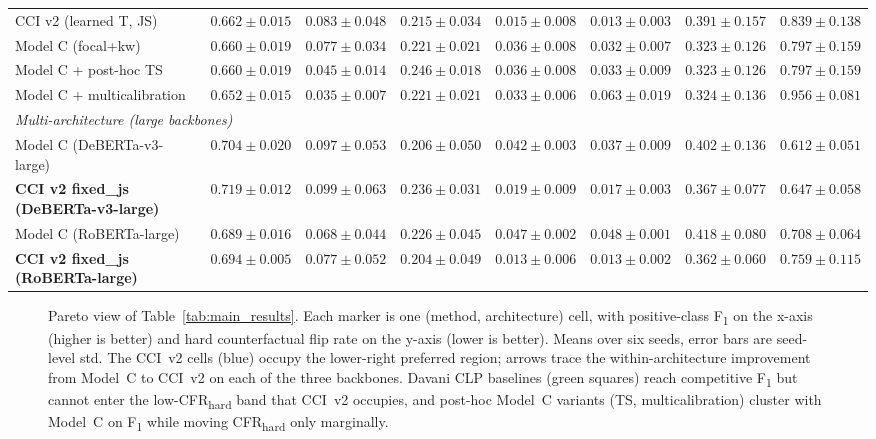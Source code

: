 \documentclass[10pt,a4paper]{article}
\begin{document}
\begin{table}[t]
\begin{tabular}{@{}lccccccc@{}}
CCI v2 (learned T, JS) & $0.662 \pm 0.015$ & $\mathbf{0.083 \pm 0.048}$ & $0.215 \pm 0.034$ & $\mathbf{0.015 \pm 0.008}$ & $\mathbf{0.013 \pm 0.003}$ & $0.391 \pm 0.157$ & $0.839 \pm 0.138$ \\
Model C (focal+kw)              & $0.660 \pm 0.019$ & $0.077 \pm 0.034$ & $0.221 \pm 0.021$ & $0.036 \pm 0.008$\textbf{\*} & $0.032 \pm 0.007$\textbf{\*} & $\mathbf{0.323 \pm 0.126}$ & $0.797 \pm 0.159$ \\
Model C + post-hoc TS           & $0.660 \pm 0.019$ & $0.045 \pm 0.014$ & $0.246 \pm 0.018$ & $0.036 \pm 0.008$\textbf{\*} & $0.033 \pm 0.009$\textbf{\*} & $\mathbf{0.323 \pm 0.126}$ & $0.797 \pm 0.159$ \\
Model C + multicalibration      & $0.652 \pm 0.015$ & $\mathbf{0.035 \pm 0.007}$ & $0.221 \pm 0.021$ & $0.033 \pm 0.006$\textbf{\*} & $0.063 \pm 0.019$\textbf{\*} & $0.324 \pm 0.136$ & $0.956 \pm 0.081$ \\
\midrule
\multicolumn{8}{l}{\emph{Multi-architecture (large backbones)}} \\
Model C (DeBERTa-v3-large)      & $0.704 \pm 0.020$ & $0.097 \pm 0.053$ & $0.206 \pm 0.050$ & $0.042 \pm 0.003$ & $0.037 \pm 0.009$ & $0.402 \pm 0.136$ & $\mathbf{0.612 \pm 0.051}$ \\
\textbf{CCI v2 fixed\_js (DeBERTa-v3-large)} & $\mathbf{0.719 \pm 0.012}$ & $0.099 \pm 0.063$ & $0.236 \pm 0.031$ & $0.019 \pm 0.009$ & $0.017 \pm 0.003$ & $0.367 \pm 0.077$ & $0.647 \pm 0.058$ \\
Model C (RoBERTa-large)         & $0.689 \pm 0.016$ & $0.068 \pm 0.044$ & $0.226 \pm 0.045$ & $0.047 \pm 0.002$ & $0.048 \pm 0.001$ & $0.418 \pm 0.080$ & $0.708 \pm 0.064$ \\
\textbf{CCI v2 fixed\_js (RoBERTa-large)} & $0.694 \pm 0.005$ & $0.077 \pm 0.052$ & $\mathbf{0.204 \pm 0.049}$ & $\mathbf{0.013 \pm 0.006}$ & $0.013 \pm 0.002$ & $\mathbf{0.362 \pm 0.060}$ & $0.759 \pm 0.115$ \\
\bottomrule
\end{tabular}
\end{table}

\begin{figure}[h]
\centering
\caption{Pareto view of Table~\ref{tab:main_results}. Each marker is one (method, architecture) cell, with positive-class F\textsubscript{1} on the x-axis (higher is better) and hard counterfactual flip rate on the y-axis (lower is better). Means over six seeds, error bars are seed-level std. The CCI~v2 cells (blue) occupy the lower-right preferred region; arrows trace the within-architecture improvement from Model~C to CCI~v2 on each of the three backbones. Davani CLP baselines (green squares) reach competitive F\textsubscript{1} but cannot enter the low-CFR\textsubscript{hard} band that CCI~v2 occupies, and post-hoc Model~C variants (TS, multicalibration) cluster with Model~C on F\textsubscript{1} while moving CFR\textsubscript{hard} only marginally.}
\label{fig:pareto_main}
\end{figure}
\end{document}
